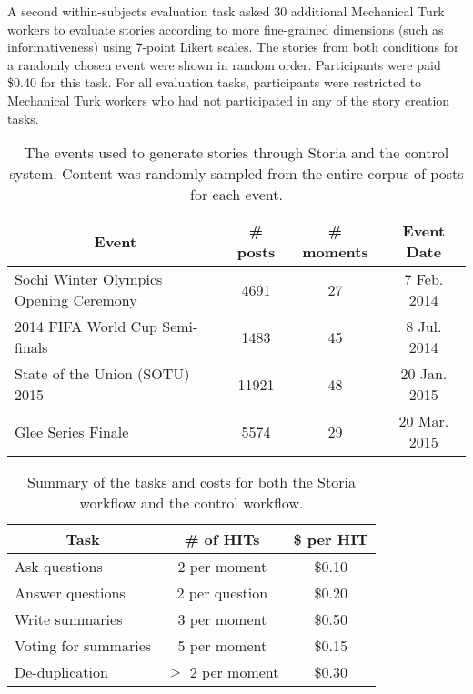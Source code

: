 A second within-subjects evaluation task asked 30 additional Mechanical Turk workers to evaluate stories according to more fine-grained dimensions (such as informativeness) using 7-point Likert scales. The stories from both conditions for a randomly chosen event were shown in random order. Participants were paid \$0.40 for this task. For all evaluation tasks, participants were restricted to Mechanical Turk workers who had not participated in any of the story creation tasks.



\begin{table}[!t]
  \centering
  \begin{tabularx}{\columnwidth}{X c c c}
    \toprule
    \multicolumn{1}{c}{\textbf{Event}} &
    \multicolumn{1}{c}{\textbf{\# posts}} & 
    \multicolumn{1}{c}{\textbf{\# moments}} & 
    \multicolumn{1}{c}{\textbf{Event Date}} \\
    \midrule
    Sochi Winter Olympics Opening Ceremony & 4691 & 27 & 7 Feb. 2014 \\
    \hline
    2014 FIFA World Cup Semi-finals & 1483 & 45 & 8 Jul. 2014 \\
    \hline
    State of the Union (SOTU) 2015 & 11921 & 48 & 20 Jan. 2015 \\
\hline
    Glee Series Finale & 5574 & 29 & 20 Mar. 2015 \\
    \bottomrule
  \end{tabularx}
  \caption{The events used to generate stories through Storia and the control system. Content was randomly sampled from the entire corpus of posts for each event.}
  \label{tab:story_table}
\end{table}

\begin{table}[!t]
  \centering
  \begin{tabularx}{\columnwidth}{X c c}
    \toprule
    \multicolumn{1}{c}{\textbf{Task}} &
    \textbf{\# of HITs} & 
    \textbf{\$ per HIT} \\
    \midrule
    \normalsize Ask questions & 2 per moment & \$0.10 \\
    \hline
    \normalsize Answer questions & 2 per question & \$0.20 \\
    \hline
    \normalsize Write summaries & 3 per moment & \$0.50 \\
    \hline
    \normalsize Voting for summaries & 5 per moment & \$0.15 \\
    \hline
    \normalsize De-duplication & $\geq$ 2 per moment & \$0.30 \\
    \bottomrule
  \end{tabularx}
  \caption{Summary of the tasks and costs for both the Storia workflow and the control workflow.}
  \label{tab:final_table}
\end{table}


